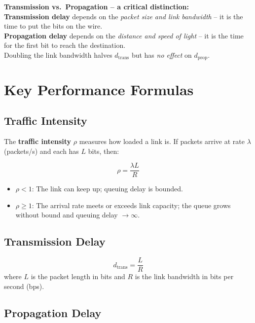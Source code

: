 \documentclass[11pt, letterpaper]{article}
\begin{document}
\begin{tcolorbox}[colback=part5bg, colframe=sectionteal, arc=3pt, boxrule=1pt]
\textbf{Transmission vs.\ Propagation -- a critical distinction:}\\
\textbf{Transmission delay} depends on the \emph{packet size and link bandwidth} -- it is the time to put the bits on the wire. \\
\textbf{Propagation delay} depends on the \emph{distance and speed of light} -- it is the time for the first bit to reach the destination. \\
Doubling the link bandwidth halves $d_{\text{trans}}$ but has \emph{no effect} on $d_{\text{prop}}$.
\end{tcolorbox}

\section*{Key Performance Formulas}

\subsection*{Traffic Intensity}

The \textbf{traffic intensity} $\rho$ measures how loaded a link is. If packets arrive at rate $\lambda$ (packets/s) and each has $L$ bits, then:

\[
  \rho = \frac{\lambda L}{R}
\]

\begin{itemize}[noitemsep]
  \item $\rho < 1$: The link can keep up; queuing delay is bounded.
  \item $\rho \geq 1$: The arrival rate meets or exceeds link capacity; the queue grows without bound and queuing delay $\to \infty$.
\end{itemize}

\subsection*{Transmission Delay}

\[
  d_{\text{trans}} = \frac{L}{R}
\]
where $L$ is the packet length in bits and $R$ is the link bandwidth in bits per second (bps).

\subsection*{Propagation Delay}
\end{document}
